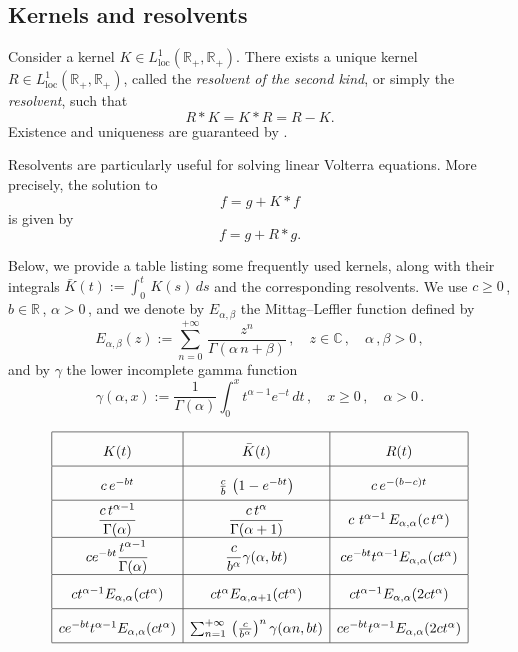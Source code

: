 \documentclass{article}
\newcommand{\R}{\mathbb{R}}
\newcommand{\1}{\mathbbm{1}}
\numberwithin{equation}{section}
\begin{document}
\begin{appendix}
\section{Kernels and resolvents}\label{app:kernels}
Consider a kernel $K \in L^1_{\mathrm{loc}}(\mathbb{R}_+, \mathbb{R}_+)$.
There exists a unique kernel $R \in L^1_{\mathrm{loc}}(\mathbb{R}_+, \mathbb{R}_+)$, called the \emph{resolvent of the second kind}, or simply the \emph{resolvent}, such that
\[
R * K = K * R = R - K.
\]
Existence and uniqueness are guaranteed by \citet*[Theorems 2.3.1 and 2.3.5]{Gripenberg1990}.

Resolvents are particularly useful for solving linear Volterra equations. More precisely, the solution to
\[
f = g + K * f
\]
is given by
\[
f = g + R * g.
\]

Below, we provide a table listing some frequently used kernels, along with their integrals $\bar K(t) := \int_0^t\,K(s)\,ds$ and the corresponding resolvents. We use $c \geq 0\,$, $b \in \R\,$, $\alpha > 0\,$, and we denote by $E_{\alpha, \beta}$ the Mittag--Leffler function defined by
$$
E_{\alpha, \beta}(z) := \sum_{n = 0}^{+ \infty}\,\frac{z^n}{\Gamma(\alpha\,n + \beta)}\,, \quad z \in \mathbb C\,, \quad \alpha\,, \beta > 0\,,
$$
and by $\gamma$ the lower incomplete gamma function 
$$
\gamma(\alpha, x) := \dfrac{1}{\Gamma(\alpha)}\int_0^xt^{\alpha - 1}e^{-t}\,dt\,, \quad x \geq 0\,, \quad \alpha > 0\,.
$$

\begin{equation*}
\renewcommand{\arraystretch}{2}
    \begin{array}{|c|c|c|}
        \hline
        K(t) & \bar K(t) & R(t)   \\
        \hline
        c\,e^{-bt} & \frac{c}{b}\,\left(1 - e^{-bt}\right) & c\,e^{-(b-c)t} \\
        \hline
        \dfrac{c\,t^{\alpha - 1}}{\Gamma(\alpha)} & \dfrac{c\,t^{\alpha}}{\Gamma(\alpha+1)} & c\,\,t^{\alpha - 1}\,E_{\alpha,\alpha}(c\,t^{\alpha}) \\
        \hline
        c e^{-bt}\dfrac{t^{\alpha-1}}{\Gamma(\alpha)} & \dfrac{c}{b^\alpha}\gamma(\alpha, bt) & c e^{-bt} t^{\alpha - 1}E_{\alpha, \alpha}(ct^\alpha)\\
        \hline
        c t^{\alpha - 1}E_{\alpha, \alpha}(ct^\alpha) &  c t^{\alpha}E_{\alpha, \alpha + 1}(ct^\alpha) & c  t^{\alpha - 1}E_{\alpha, \alpha}(2ct^\alpha) \\
        \hline
         c e^{-bt} t^{\alpha - 1}E_{\alpha, \alpha}(ct^\alpha) &  \sum_{n = 1}^{+ \infty}\,\left(\frac{c}{b^\alpha}\right)^n\gamma(\alpha n, bt) & c e^{-bt} t^{\alpha - 1}E_{\alpha, \alpha}(2ct^\alpha) \\
        \hline
    \end{array}
\end{equation*}
    

\end{appendix}
\end{document}
